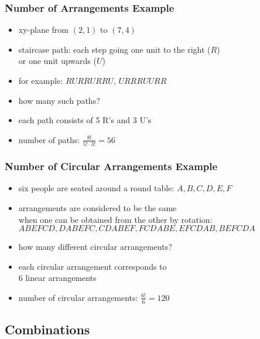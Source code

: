 \documentclass[dvipsnames]{beamer}
\begin{document}
\begin{frame}
  \frametitle{Number of Arrangements Example}

  \begin{example}
    \begin{itemize}
      \item xy-plane from $(2,1)$ to $(7,4)$
      \item staircase path: each step going one unit to the right ($R$)\\
        or one unit upwards ($U$)
      \item for example: $RURRURRU$, $URRRUURR$
      \item how many such paths?

      \pause
      \medskip
      \item each path consists of 5 R's and 3 U's
      \item number of paths: $\frac{8!}{5! \cdot 3!} = 56$
    \end{itemize}
  \end{example}
\end{frame}

\begin{frame}
  \frametitle{Number of Circular Arrangements Example}

  \begin{example}
    \begin{itemize}
      \item six people are seated around a round table: $A,B,C,D,E,F$
      \item arrangements are considered to be the same\\
        when one can be obtained from the other by rotation:\\
        \smallskip
        $ABEFCD, DABEFC, CDABEF, FCDABE, EFCDAB, BEFCDA$
      \item how many different circular arrangements?

      \pause
      \medskip
      \item each circular arrangement corresponds to\\
        6 linear arrangements
      \item number of circular arrangements: $\frac{6!}{6} = 120$
    \end{itemize}
  \end{example}
\end{frame}

\subsection{Combinations}
\end{document}
